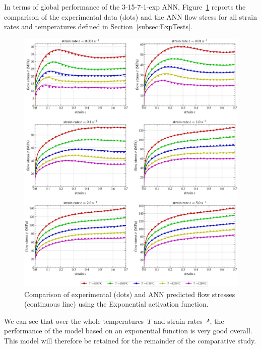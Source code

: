 \documentclass[algorithms,article,submit,pdftex,oneauthors]{Definitions/mdpi}
\DeclareRobustCommand{\mdot}[1]{\accentset{\mbox{\bfseries .}}{#1}}
\begin{document}
In terms of global performance of the 3-15-7-1-exp ANN, Figure~\ref{fig:ANN-ExpFit} reports the comparison of the experimental data (dots) and the ANN flow stress for all strain rates and temperatures defined in Section~\ref{subsec:ExpTests}.
\begin{figure}[h!]
\centering
\includegraphics[width=0.95\columnwidth]{Figures/3Cr2Mo-3-15-7-1-exponential}
\caption{Comparison of experimental (dots) and ANN predicted flow stresses (continuous line) using the Exponential activation function.}
\label{fig:ANN-ExpFit}
\end{figure}
We can see that over the whole temperatures~$T$ and strain rates~$\mdot{\varepsilon}$, the performance of the model based on an exponential function is very good overall.
This model will therefore be retained for the remainder of the comparative study.
\end{document}
